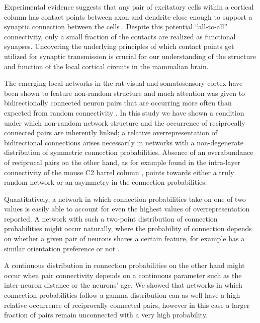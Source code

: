 

Experimental evidence suggests that any pair of excitatory cells within a cortical column has contact points between axon and dendrite close enough to support a synaptic connection between the cells \cite{Stepanyants2004,Kalisman2005}.
%
Despite this potential \enquote{all-to-all} connectivity, only a small fraction of the contacts are realized as functional synapses.
%
Uncovering the underlying principles of which contact points get utilized for synaptic transmission is crucial for our understanding of the structure and function of the local cortical circuits in the mammalian brain.


The emerging local networks in the rat visual and somatosensory cortex have been shown to feature non-random structure \cite{Song2005, Perin2011} and much attention was given to bidirectionally connected neuron pairs that are occurring more often than expected from random connectivity \cite{Bourjaily2011, Clopath2010, Miner2016}.
%
In this study we have shown a condition under which non-random network structure and the occurrence of reciprocally connected pairs are inherently linked; a relative overrepresentation of bidirectional connections arises necessarily in networks with a non-degenerate distribution of symmetric connection probabilities.
%
Absence of an overabundance of reciprocal pairs on the other hand, as for example found in the intra-layer connectivity of the mouse C2 barrel column \cite{Lefort2009}, points towards either a truly random network or an asymmetry in the connection probabilities. 


Quantitatively, a network in which connection probabilities take on one of two values is easily able to account for even the highest values of overrepresentation reported.
%
A network with such a two-point distribution of connection probabilities might occur naturally, where the probability of connection depends on whether a given pair of neurons shares a certain feature, for example has a similar orientation preference or not \cite{Lee2016a}.


A continuous distribution in connection probabilities on the other hand might occur when pair connectivity depends on a continuous parameter such as the inter-neuron distance or the neurons' age.
%
We showed that networks in which connection probabilities follow a gamma distribution can as well have a high relative occurrence of reciprocally connected pairs, however in this case a larger fraction of pairs remain unconnected with a very high probability.


